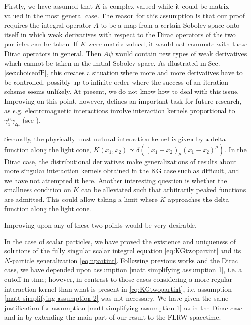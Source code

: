 \documentclass[b5paper,draft,openbib,12pt]{memoir}
\begin{document}
Firstly, we have assumed that $K$ is complex-valued while it could 
be matrix-valued in the most general case. The reason for this 
assumption is that our proof requires the integral operator $A$ to 
be a map from a certain Sobolev space onto itself in which weak 
derivatives with respect to the Dirac operators of the two particles 
can be taken. If $K$ were matrix-valued, it would not commute with 
these Dirac operators in general. Then $A \psi$ would contain new 
types of weak derivatives which cannot be taken in the initial 
Sobolev space. As illustrated in Sec. \ref{sec:choiceofB}, this 
creates a situation where more and more derivatives have to be 
controlled, possibly up to infinite order where the success of an 
iteration scheme seems unlikely. At present, we do not know how to 
deal with this issue. 
Improving on this point, however, defines an important task for 
future research, as e.g. electromagnetic interactions involve 
interaction kernels proportional to $\gamma_1^\mu \gamma_{2\mu}$ 
(see \cite{direct_interaction_quantum}).

Secondly, the physically most 
natural interaction kernel is given by a delta function along the 
light cone, $K(x_1,x_2) \propto \delta((x_1-x_2)_\mu 
(x_1-x_2)^\mu)$. In the Dirac 
case, the distributional derivatives make generalizations of 
results about more singular interaction kernels 
obtained in the KG case such as \cite{mtve,lienertcurved} difficult, 
and we have not attempted it here. 
Another interesting question is whether the smallness condition on 
$K$ can be alleviated such that arbitrarily peaked functions are 
admitted. This could allow taking a limit where $K$ approaches the 
delta function along the light cone.

Improving upon any of these two points would be very desirable.

In the case of scalar particles, we have proved the existence and 
uniqueness of solutions of the fully singular  
scalar integral equation 
\eqref{eq:KGtwopartint} and its $N$-particle generalization 
\eqref{eq:npartint}. Following previous works and the 
Dirac case, we have depended upon assumption 
\ref{matt simplifying assumption 1}, i.e.
a cutoff in time; however, in contrast to 
those cases considering a more regular interaction 
kernel than what is present in \eqref{eq:KGtwopartint}, i.e. 
assumption \ref{matt simplifying assumption 2} was not necessary.
We have given the same justification for 
assumption \ref{matt simplifying assumption 1} as in the Dirac case and 
in \cite{lienertcurved}
by extending the main part of our result to the FLRW spacetime.
\end{document}
